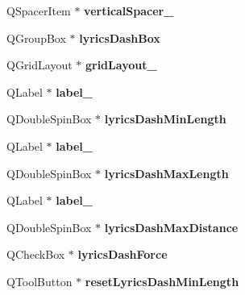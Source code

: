 \begin{DoxyCompactItemize}
Q\+Spacer\+Item $\ast$ {\bfseries vertical\+Spacer\+\_}
\item 
\mbox{\label{class_ui___edit_style_base_a2d6753f246b1f6e5aac57f8ffcf11686}} 
Q\+Group\+Box $\ast$ {\bfseries lyrics\+Dash\+Box}
\item 
\mbox{\label{class_ui___edit_style_base_aeedce21d38c5fe8b1f0a7518421aad61}} 
Q\+Grid\+Layout $\ast$ {\bfseries grid\+Layout\+\_}
\item 
\mbox{\label{class_ui___edit_style_base_abdb5cefb09b77beb781bf5f13a43a5c7}} 
Q\+Label $\ast$ {\bfseries label\+\_}
\item 
\mbox{\label{class_ui___edit_style_base_a8ff78ef626f1326c560b5e02e4884a6a}} 
Q\+Double\+Spin\+Box $\ast$ {\bfseries lyrics\+Dash\+Min\+Length}
\item 
\mbox{\label{class_ui___edit_style_base_aeac4400ec5ccbbc1e398fc8db7b1b050}} 
Q\+Label $\ast$ {\bfseries label\+\_}
\item 
\mbox{\label{class_ui___edit_style_base_af400fa440c3642cc3894a1a45c0a1386}} 
Q\+Double\+Spin\+Box $\ast$ {\bfseries lyrics\+Dash\+Max\+Length}
\item 
\mbox{\label{class_ui___edit_style_base_a2d510324dcd64d18995d4a58114e6716}} 
Q\+Label $\ast$ {\bfseries label\+\_}
\item 
\mbox{\label{class_ui___edit_style_base_a63d2bf3faea5b83ae8770369826658af}} 
Q\+Double\+Spin\+Box $\ast$ {\bfseries lyrics\+Dash\+Max\+Distance}
\item 
\mbox{\label{class_ui___edit_style_base_ab164c99c7afc518b0df71988699c431b}} 
Q\+Check\+Box $\ast$ {\bfseries lyrics\+Dash\+Force}
\item 
\mbox{\label{class_ui___edit_style_base_aef71346398bee8bbf18a695e2936ee4c}} 
Q\+Tool\+Button $\ast$ {\bfseries reset\+Lyrics\+Dash\+Min\+Length}
\item 

\end{DoxyCompactItemize}
